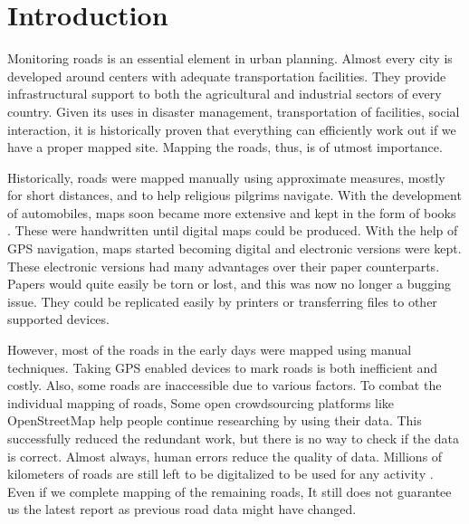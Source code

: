 \chapter{Introduction}\label{chapt:intro}

Monitoring roads is an essential element in urban planning. Almost every city is developed around centers with adequate transportation facilities. They provide infrastructural support to both the agricultural and industrial sectors of every country. Given its uses in disaster management, transportation of facilities, social interaction, it is historically proven that everything can efficiently work out if we have a proper mapped site. Mapping the roads, thus, is of utmost importance. \par

Historically, roads were mapped manually using approximate measures, mostly for short distances, and to help religious pilgrims navigate. With the development of automobiles, maps soon became more extensive and kept in the form of books \cite{firstMapBooks}. These were handwritten until digital maps could be produced. With the help of GPS navigation, maps started becoming digital and electronic versions were kept. These electronic versions had many advantages over their paper counterparts. Papers would quite easily be torn or lost, and this was now no longer a bugging issue. They could be replicated easily by printers or transferring files to other supported devices. \par

However, most of the roads in the early days were mapped using manual techniques. Taking GPS enabled devices to mark roads is both inefficient and costly. Also, some roads are inaccessible due to various factors. To combat the individual mapping of roads, Some open crowdsourcing platforms like OpenStreetMap help people continue researching by using their data. This successfully reduced the redundant work, but there is no way to check if the data is correct. Almost always, human errors reduce the quality of data. Millions of kilometers of roads are still left to be digitalized to be used for any activity \cite{MapsDoneOSM}. Even if we complete mapping of the remaining roads, It still does not guarantee us the latest report as previous road data might have changed. \par

